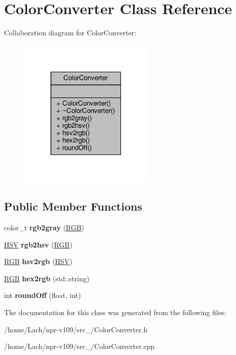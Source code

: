 \hypertarget{classColorConverter}{}\section{Color\+Converter Class Reference}
\label{classColorConverter}


Collaboration diagram for Color\+Converter\+:
\nopagebreak
\begin{figure}[H]
\begin{center}
\leavevmode
\includegraphics[width=184pt]{classColorConverter__coll__graph}
\end{center}
\end{figure}
\subsection*{Public Member Functions}
\begin{DoxyCompactItemize}
\item 
\hypertarget{classColorConverter_aa9abd3937e87e0fcb712d2ca7a611402}{}\label{classColorConverter_aa9abd3937e87e0fcb712d2ca7a611402} 
color\+\_\+t {\bfseries rgb2gray} (\hyperlink{structRGB}{R\+GB})
\item 
\hypertarget{classColorConverter_a351341558ba62951aefd6d3d9bf09785}{}\label{classColorConverter_a351341558ba62951aefd6d3d9bf09785} 
\hyperlink{structHSV}{H\+SV} {\bfseries rgb2hsv} (\hyperlink{structRGB}{R\+GB})
\item 
\hypertarget{classColorConverter_aca4539e968906df8d1ecd102464a0372}{}\label{classColorConverter_aca4539e968906df8d1ecd102464a0372} 
\hyperlink{structRGB}{R\+GB} {\bfseries hsv2rgb} (\hyperlink{structHSV}{H\+SV})
\item 
\hypertarget{classColorConverter_a43a52a206fb9f246d31af8f7e39b4110}{}\label{classColorConverter_a43a52a206fb9f246d31af8f7e39b4110} 
\hyperlink{structRGB}{R\+GB} {\bfseries hex2rgb} (std\+::string)
\item 
\hypertarget{classColorConverter_adb9a22672900e507c63b172a14713e95}{}\label{classColorConverter_adb9a22672900e507c63b172a14713e95} 
int {\bfseries round\+Off} (float, int)
\end{DoxyCompactItemize}


The documentation for this class was generated from the following files\+:\begin{DoxyCompactItemize}
\item 
/home/\+Lach/npr-\/v109/src\+\_/Color\+Converter.\+h\item 
/home/\+Lach/npr-\/v109/src\+\_/Color\+Converter.\+cpp\end{DoxyCompactItemize}
